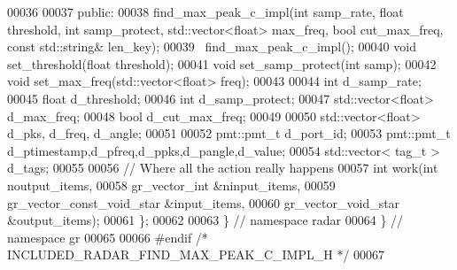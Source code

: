 \begin{DoxyCode}
00036 
00037      \textcolor{keyword}{public}:
00038       find_max_peak_c_impl(\textcolor{keywordtype}{int} samp_rate, \textcolor{keywordtype}{float} threshold, \textcolor{keywordtype}{int} samp\_protect, std::vector<float> max\_freq, \textcolor{keywordtype}{
      bool} cut\_max\_freq, \textcolor{keyword}{const} std::string& len\_key);
00039       ~find_max_peak_c_impl();
00040       \textcolor{keywordtype}{void} set_threshold(\textcolor{keywordtype}{float} threshold);
00041       \textcolor{keywordtype}{void} set_samp_protect(\textcolor{keywordtype}{int} samp);
00042       \textcolor{keywordtype}{void} set_max_freq(std::vector<float> freq);
00043       
00044       \textcolor{keywordtype}{int} d_samp_rate;
00045       \textcolor{keywordtype}{float} d_threshold;
00046       \textcolor{keywordtype}{int} d_samp_protect;
00047       std::vector<float> d_max_freq;
00048       \textcolor{keywordtype}{bool} d_cut_max_freq;
00049       
00050       std::vector<float> d_pks, d_freq, d_angle;
00051       
00052       pmt::pmt\_t d_port_id;
00053       pmt::pmt\_t d_ptimestamp,d_pfreq,d_ppks,d_pangle,d_value;
00054       std::vector< tag\_t > d_tags;
00055 
00056       \textcolor{comment}{// Where all the action really happens}
00057       \textcolor{keywordtype}{int} work(\textcolor{keywordtype}{int} noutput\_items,
00058                gr\_vector\_int &ninput\_items,
00059                gr\_vector\_const\_void\_star &input\_items,
00060                gr\_vector\_void\_star &output\_items);
00061     \};
00062 
00063   \} \textcolor{comment}{// namespace radar}
00064 \} \textcolor{comment}{// namespace gr}
00065 
00066 \textcolor{preprocessor}{#endif }\textcolor{comment}{/* INCLUDED\_RADAR\_FIND\_MAX\_PEAK\_C\_IMPL\_H */}\textcolor{preprocessor}{}
00067 
\end{DoxyCode}
